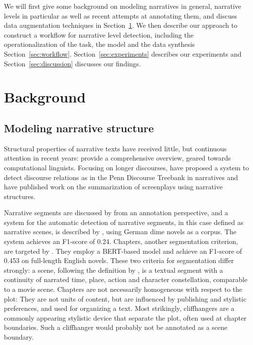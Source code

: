 \documentclass[10pt, a4paper]{article}
\begin{document}
We will first give some background on modeling narratives in general, narrative levels in particular as well as recent attempts at annotating them,  and discuss data augmentation techniques in Section~\ref{sec:background}. We then describe our approach to construct a workflow for narrative level detection, including the operationalization of the task, the model and the data synthesis Section~\ref{sec:workflow}. Section~\ref{sec:experiments} describes our experiments and Section~\ref{sec:discussion} discusses our findings. 

\section{Background}
\label{sec:background}

\subsection{Modeling narrative structure}

Structural properties of narrative texts have received little, but continuous attention in recent years:   provide a comprehensive overview, geared towards computational linguists. Focusing on longer discourses,  have proposed a system to detect discourse relations as in the Penn Discourse Treebank in narratives and  have published work on the summarization of screenplays using narrative structures. 

Narrative segments are discussed by  from an annotation perspective, and a system for the automatic detection of narrative segments, in this case defined as narrative scenes, 
is described by , using German dime novels as a corpus. The system achieves an F1-score of \num{0.24}. Chapters, another segmentation criterion, are targeted by . They employ a BERT-based model and achieve an F1-score of \num{0.453} on full-length English novels. These two criteria for segmentation differ strongly: a scene, following the definition by , is a textual segment with a continuity of narrated time, place, action and character constellation, comparable to a movie scene. Chapters are not necessarily homogeneous with respect to the plot: 
They are not units of content, but are influenced by publishing and stylistic preferences, and used for organizing a text. Most strikingly, cliffhangers are a commonly appearing stylistic device that separate the plot, often used at chapter boundaries. Such a cliffhanger would probably not be annotated as a scene boundary.
\end{document}
